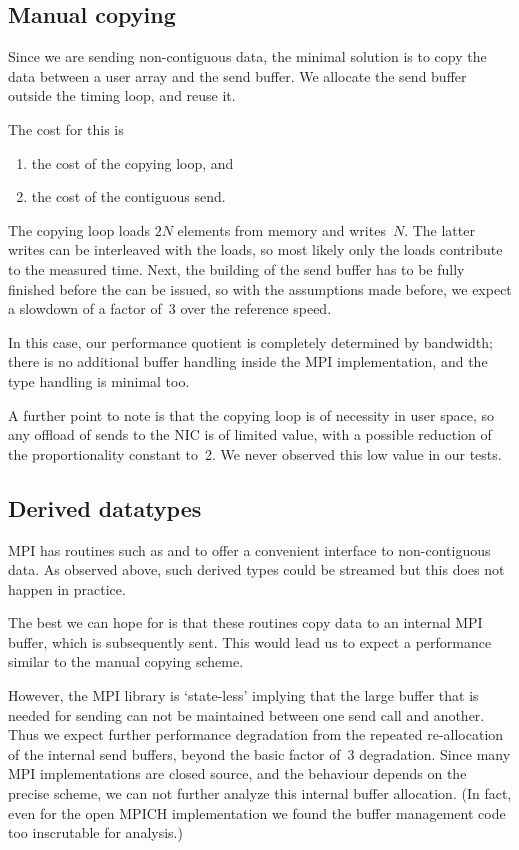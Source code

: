 \subsection{Manual copying}

Since we are sending non-contiguous data, the minimal solution is to
copy the data between a user array and the send buffer. We allocate
the send buffer outside the timing loop, and reuse it.

The cost for this is
\begin{enumerate}
\item the cost of the copying loop, and
\item the cost of the contiguous send.
\end{enumerate}
The copying loop loads $2N$ elements from memory and writes~$N$.
The
latter writes can be interleaved with the loads, so most likely only
the loads contribute to the measured time.
%
Next, the building of the send buffer has to be fully finished before
the  can be issued, so with the assumptions made before,
we expect a slowdown of a factor of~3 over the reference speed.

In this case, our performance quotient is completely determined by
bandwidth; there is no additional buffer handling inside the MPI
implementation, and the type handling is minimal too.

A further point to note is that the copying loop is of necessity in
user space, so any offload of sends to the \ac{NIC} is of limited
value, with a possible reduction of the proportionality constant
to~2. We never observed this low value in our tests.

\subsection{Derived datatypes}

MPI has routines such as  and
 to offer a convenient interface to
non-contiguous data. As observed above, such derived types could
be streamed but this does not happen in practice.

The best we can hope for is that these routines copy
data to an internal MPI buffer, which is subsequently sent.
This would lead us to  expect a performance similar to the manual copying scheme.

However, the MPI library is `state-less' implying that the large
buffer that is needed for sending can not be maintained between one
send call and another. Thus we expect further performance degradation
from the repeated re-allocation of the internal send buffers,
beyond the basic factor of~3 degradation.
Since many MPI implementations are closed source, and the behaviour
depends on the precise scheme, we can not further analyze this
internal buffer allocation.
(In fact, even for
the open MPICH implementation we found the buffer management code too
inscrutable for analysis.)

